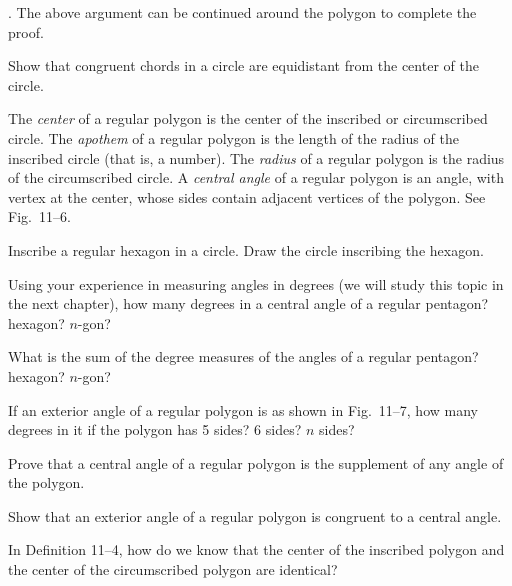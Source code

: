 \documentclass[11pt]{book}
\theoremstyle{bkplain}
\theoremstyle{XIplainnote}
\theoremstyle{bkplain}
\theoremstyle{bkplain}
\begin{document}
. The above argument can be continued around the polygon to complete
the proof.

\FIGXIFIVESIX

Show that congruent chords in a circle are equidistant from the center of the
circle.

\begin{definition}
The \emph{center} of a regular polygon is the center of the inscribed or
circumscribed circle. The \emph{apothem} of a regular polygon is the length of
the radius of the inscribed circle (that is, a number). The \emph{radius} of a
regular polygon is the radius of the circumscribed circle. A \emph{central
angle} of a regular polygon is an angle, with vertex at the center, whose sides
contain adjacent vertices of the polygon. See Fig.~11--6.
\end{definition}

\begin{exercisecols}
\begin{exlist}
\item Inscribe a regular hexagon in a circle. Draw the circle inscribing the
      hexagon.
\item Using your experience in measuring angles in degrees (we will study this
      topic in the next chapter), how many degrees in a central angle of a
      regular pentagon? hexagon? $n$-gon?
\item What is the sum of the degree measures of the angles of a regular
      pentagon? hexagon? $n$-gon?
\item If an exterior angle of a regular polygon is as shown in Fig.~11--7, how
      many degrees in it if the polygon has 5 sides? 6 sides? $n$ sides?
\exfig{\FIGXISEVEN}
\item Prove that a central angle of a regular polygon is the supplement of any
      angle of the polygon.
\item Show that an exterior angle of a regular polygon is congruent to a
      central angle.
\item In Definition 11--4, how do we know that the center of the inscribed
      polygon and the center of the circumscribed polygon are identical?
\end{exlist}
\end{exercisecols}
\end{document}
